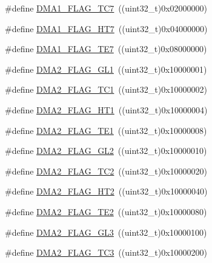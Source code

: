 \begin{DoxyCompactItemize}
\item 
\#define \hyperlink{group___d_m_a__flags__definition_ga327907756920f193d5d57d8cca845ad6}{D\+M\+A1\+\_\+\+F\+L\+A\+G\+\_\+\+T\+C7}~((uint32\+\_\+t)0x02000000)
\item 
\#define \hyperlink{group___d_m_a__flags__definition_ga1a7cbf9dffa4fc5ef1cedb46ea446387}{D\+M\+A1\+\_\+\+F\+L\+A\+G\+\_\+\+H\+T7}~((uint32\+\_\+t)0x04000000)
\item 
\#define \hyperlink{group___d_m_a__flags__definition_ga8b967e41e2d2dcc6d638a664f8e0900c}{D\+M\+A1\+\_\+\+F\+L\+A\+G\+\_\+\+T\+E7}~((uint32\+\_\+t)0x08000000)
\item 
\#define \hyperlink{group___d_m_a__flags__definition_ga34b82697f14e2fa9f7abeb4c43502822}{D\+M\+A2\+\_\+\+F\+L\+A\+G\+\_\+\+G\+L1}~((uint32\+\_\+t)0x10000001)
\item 
\#define \hyperlink{group___d_m_a__flags__definition_ga828c97967dbdb48d267ed0f0c4e9b8a5}{D\+M\+A2\+\_\+\+F\+L\+A\+G\+\_\+\+T\+C1}~((uint32\+\_\+t)0x10000002)
\item 
\#define \hyperlink{group___d_m_a__flags__definition_ga2264376d92756f07122883c8f3359258}{D\+M\+A2\+\_\+\+F\+L\+A\+G\+\_\+\+H\+T1}~((uint32\+\_\+t)0x10000004)
\item 
\#define \hyperlink{group___d_m_a__flags__definition_ga415793b309369076a9d797ad0757a9c1}{D\+M\+A2\+\_\+\+F\+L\+A\+G\+\_\+\+T\+E1}~((uint32\+\_\+t)0x10000008)
\item 
\#define \hyperlink{group___d_m_a__flags__definition_gaa646f1ffc4468931a748ecff6440d40f}{D\+M\+A2\+\_\+\+F\+L\+A\+G\+\_\+\+G\+L2}~((uint32\+\_\+t)0x10000010)
\item 
\#define \hyperlink{group___d_m_a__flags__definition_ga7da2f61b8c67923904312796fd76def3}{D\+M\+A2\+\_\+\+F\+L\+A\+G\+\_\+\+T\+C2}~((uint32\+\_\+t)0x10000020)
\item 
\#define \hyperlink{group___d_m_a__flags__definition_gaa4ecfdaca0509737af68143d23d0267c}{D\+M\+A2\+\_\+\+F\+L\+A\+G\+\_\+\+H\+T2}~((uint32\+\_\+t)0x10000040)
\item 
\#define \hyperlink{group___d_m_a__flags__definition_ga3d396b14851e789ad549126da55b7f3f}{D\+M\+A2\+\_\+\+F\+L\+A\+G\+\_\+\+T\+E2}~((uint32\+\_\+t)0x10000080)
\item 
\#define \hyperlink{group___d_m_a__flags__definition_ga4c56bb0c92db51e9147b122f2dff1c0a}{D\+M\+A2\+\_\+\+F\+L\+A\+G\+\_\+\+G\+L3}~((uint32\+\_\+t)0x10000100)
\item 
\#define \hyperlink{group___d_m_a__flags__definition_ga3b704db8a45d4410509f3552e8b2095f}{D\+M\+A2\+\_\+\+F\+L\+A\+G\+\_\+\+T\+C3}~((uint32\+\_\+t)0x10000200)

\end{DoxyCompactItemize}
